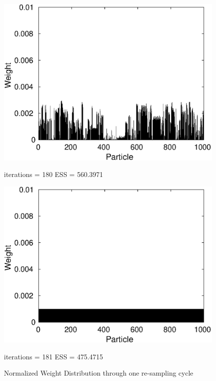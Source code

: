 \documentclass[12pt]{article}
\begin{document}
\begin{figure}[h!]
\begin{minipage}{0.5\textwidth}
		\includegraphics[scale = 0.5]{./Figures/180.eps}
		\caption*{iterations = 180 ESS = 560.3971}
	\end{minipage}%
	\begin{minipage}{0.5\textwidth}
		\centering
		\includegraphics[scale = 0.5]{./Figures/181resampled.eps}
		\caption*{iterations = 181 ESS = 475.4715}
	\end{minipage}%
	\caption{Normalized Weight Distribution through one re-sampling cycle}
\end{figure}

\newpage
\end{document}
